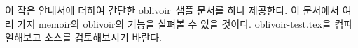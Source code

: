 \documentclass[
	12pt,
	a4paper,
	kosection,
	footnote,
	nobookmarks,
	microtype,
	figtabcapt,
]{oblivoir}
\def\myLabel#1#2{\label{#1}}
\def\myLabel#1#2{\label{#2}}
\newcommand\obclass{ob\-liv\-oir\oblivoirallowbreak}
\begin{document}
이 작은 안내서에 더하여 간단한 \obclass\ 샘플 문서를 하나 제공한다.
이 문서에서 여러 가지 memoir와 \obclass 의 기능을 살펴볼 수 있을 것이다.
oblivoir-test.tex을 컴파일해보고 소스를 검토해보시기 바란다.

%
%
%
\end{document}
